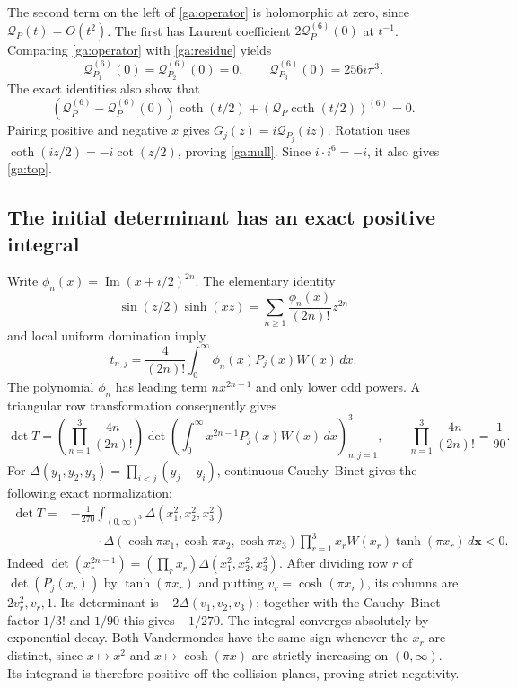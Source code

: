 \documentclass[11pt,a4paper]{article}
\theoremstyle{definition}
\theoremstyle{remark}
\numberwithin{equation}{section}
\begin{document}
The second term on the left of \eqref{ga:operator} is holomorphic
at zero, since $\mathcal Q_P(t)=O(t^2)$.  The first has Laurent
coefficient $2\mathcal Q_P^{(6)}(0)$ at $t^{-1}$.
Comparing \eqref{ga:operator} with \eqref{ga:residue} yields
\[
 \mathcal Q_{P_1}^{(6)}(0)=\mathcal Q_{P_2}^{(6)}(0)=0,
 \qquad\mathcal Q_{P_3}^{(6)}(0)=256i\pi^3.
\]
The exact identities also show that
\[
 (\mathcal Q_P^{(6)}-\mathcal Q_P^{(6)}(0))\coth(t/2)
                   +(\mathcal Q_P\coth(t/2))^{(6)}=0.
\]
Pairing positive and negative $x$ gives
$G_j(z)=i\mathcal Q_{P_j}(iz)$.  Rotation uses
$\coth(iz/2)=-i\cot(z/2)$, proving \eqref{ga:null}.
Since $i\cdot i^6=-i$, it also gives \eqref{ga:top}.

\subsection{The initial determinant has an exact positive integral}

Write $\phi_n(x)=\operatorname{Im}(x+i/2)^{2n}$.  The elementary
identity
\[
 \sin(z/2)\sinh(xz)=\sum_{n\ge1}\frac{\phi_n(x)}{(2n)!}z^{2n}
\]
and local uniform domination imply
\[
               t_{n,j}=\frac4{(2n)!}
                   \int_0^\infty\phi_n(x)P_j(x)W(x)\,dx.
\]
The polynomial $\phi_n$ has leading term $nx^{2n-1}$ and only
lower odd powers.  A triangular row transformation consequently gives
\[
 \det T=\left(\prod_{n=1}^3\frac{4n}{(2n)!}\right)
   \det\left(\int_0^\infty x^{2n-1}P_j(x)W(x)\,dx\right)_{n,j=1}^3,
 \qquad\prod_{n=1}^3\frac{4n}{(2n)!}=\frac1{90}.
\]
For $\Delta(y_1,y_2,y_3)=\prod_{i<j}(y_j-y_i)$,
continuous Cauchy--Binet gives the following exact normalization:
\begin{equation}\label{ga:initial-determinant}
 \boxed{\begin{aligned}
 \det T={}&-\frac1{270}\int_{(0,\infty)^3}
       \Delta(x_1^2,x_2^2,x_3^2)\\
 &\qquad\cdot\Delta(\cosh\pi x_1,\cosh\pi x_2,\cosh\pi x_3)
       \prod_{r=1}^3x_rW(x_r)\tanh(\pi x_r)\,d\boldsymbol{x}<0.
 \end{aligned}}
\end{equation}
Indeed $\det(x_r^{2n-1})=(\prod_rx_r)\Delta(x_1^2,x_2^2,x_3^2)$.
After dividing row $r$ of $\det(P_j(x_r))$ by
$\tanh(\pi x_r)$ and putting $v_r=\cosh(\pi x_r)$, its
columns are $2v_r^2,v_r,1$.  Its determinant is
$-2\Delta(v_1,v_2,v_3)$; together with the Cauchy--Binet factor
$1/3!$ and $1/90$ this gives $-1/270$.
The integral converges absolutely by exponential decay.  Both
Vandermondes have the same sign whenever the $x_r$ are distinct,
since $x\mapsto x^2$ and $x\mapsto\cosh(\pi x)$ are strictly
increasing on $(0,\infty)$.  Its integrand is therefore positive
off the collision planes, proving strict negativity.
\end{document}
